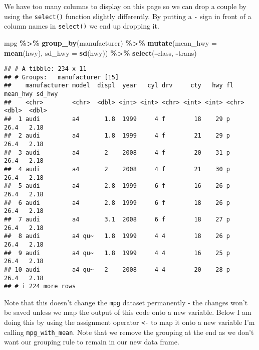 \documentclass[
]{book}
\newenvironment{Shaded}{\begin{snugshade}}{\end{snugshade}}
\newcommand{\AttributeTok}[1]{\textcolor[rgb]{0.13,0.29,0.53}{#1}}
\newcommand{\FunctionTok}[1]{\textcolor[rgb]{0.13,0.29,0.53}{\textbf{#1}}}
\newcommand{\NormalTok}[1]{#1}
\newcommand{\SpecialCharTok}[1]{\textcolor[rgb]{0.81,0.36,0.00}{\textbf{#1}}}
\begin{document}
We have too many columns to display on this page so we can drop a couple by using the \texttt{select()} function slightly differently. By putting a \texttt{-} sign in front of a column names in \texttt{select()} we end up dropping it.

\begin{Shaded}
\begin{Highlighting}[]
\NormalTok{mpg }\SpecialCharTok{\%\textgreater{}\%} 
  \FunctionTok{group\_by}\NormalTok{(manufacturer) }\SpecialCharTok{\%\textgreater{}\%}
  \FunctionTok{mutate}\NormalTok{(}\AttributeTok{mean\_hwy =} \FunctionTok{mean}\NormalTok{(hwy), }\AttributeTok{sd\_hwy =} \FunctionTok{sd}\NormalTok{(hwy)) }\SpecialCharTok{\%\textgreater{}\%}
  \FunctionTok{select}\NormalTok{(}\SpecialCharTok{{-}}\NormalTok{class, }\SpecialCharTok{{-}}\NormalTok{trans)}
\end{Highlighting}
\end{Shaded}

\begin{verbatim}
## # A tibble: 234 x 11
## # Groups:   manufacturer [15]
##    manufacturer model  displ  year   cyl drv     cty   hwy fl    mean_hwy sd_hwy
##    <chr>        <chr>  <dbl> <int> <int> <chr> <int> <int> <chr>    <dbl>  <dbl>
##  1 audi         a4       1.8  1999     4 f        18    29 p         26.4   2.18
##  2 audi         a4       1.8  1999     4 f        21    29 p         26.4   2.18
##  3 audi         a4       2    2008     4 f        20    31 p         26.4   2.18
##  4 audi         a4       2    2008     4 f        21    30 p         26.4   2.18
##  5 audi         a4       2.8  1999     6 f        16    26 p         26.4   2.18
##  6 audi         a4       2.8  1999     6 f        18    26 p         26.4   2.18
##  7 audi         a4       3.1  2008     6 f        18    27 p         26.4   2.18
##  8 audi         a4 qu~   1.8  1999     4 4        18    26 p         26.4   2.18
##  9 audi         a4 qu~   1.8  1999     4 4        16    25 p         26.4   2.18
## 10 audi         a4 qu~   2    2008     4 4        20    28 p         26.4   2.18
## # i 224 more rows
\end{verbatim}

Note that this doesn't change the \texttt{mpg} dataset permanently - the changes won't be saved unless we map the output of this code onto a new variable. Below I am doing this by using the assignment operator \texttt{\textless{}-} to map it onto a new variable I'm calling \texttt{mpg\_with\_mean}. Note that we remove the grouping at the end as we don't want our grouping rule to remain in our new data frame.
\end{document}
